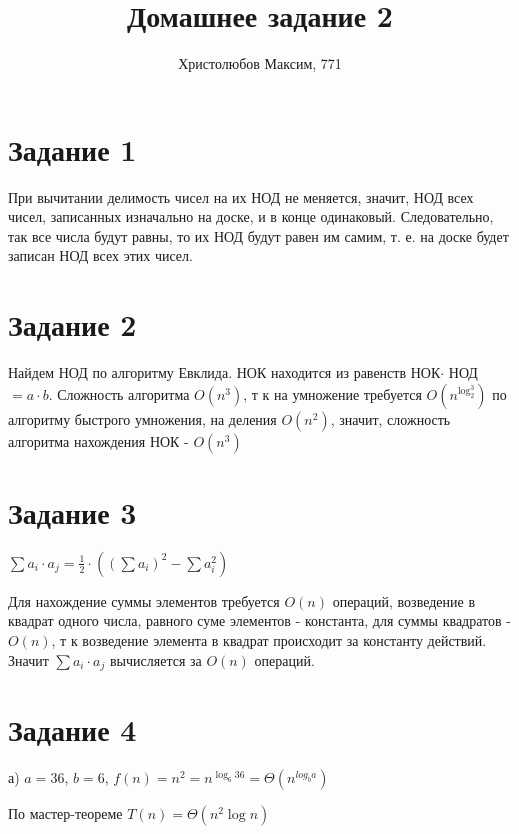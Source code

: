 \documentclass[a4paper,12pt]{article}
\author{Христолюбов Максим, 771}
\title{Домашнее задание 2}
\date{ }
\begin{document}

\maketitle

\section*{Задание 1}  
\hspace{0.5cm}

При вычитании делимость чисел на их НОД не меняется, значит, НОД всех чисел, записанных изначально на доске, и в конце одинаковый. Следовательно, так все числа будут равны, то их НОД будут равен им самим, т. е. на доске будет записан НОД всех этих чисел.

\section*{Задание 2}  
\hspace{0.5cm}

Найдем НОД по алгоритму Евклида. НОК находится из равенств НОК$\cdot$ НОД$=a\cdot b$. Сложность алгоритма $O(n^3)$, т к на умножение требуется $O(n^{\log_{2}^{3}})$ по алгоритму быстрого умножения, на деления $O(n^2)$, значит, сложность алгоритма нахождения НОК - $O(n^3)$
 
\section*{Задание 3}  
\hspace{0.5cm}

 $\sum {a_{i}\cdot a_{j}} = \frac{1}{2}\cdot \left( \left( \sum a_{i}\right)^2-\sum{a_{i}^2}\right)$
 	
Для нахождение суммы элементов требуется $O(n)$ операций, возведение в квадрат одного числа, равного суме элементов - константа, для суммы квадратов - $O(n)$, т к возведение элемента в квадрат происходит за константу действий. Значит $\sum {a_{i}\cdot a_{j}}$ вычисляется за $O(n)$ операций.

\section*{Задание 4}  
\hspace{0.5cm}
а) $a=36$, $b=6$, $f(n)=n^2=n^{\log_{6}{36}}=\Theta (n^{log_{b}{a}})$

По мастер-теореме $T(n)=\Theta (n^2\log{n})$
\end{document}
